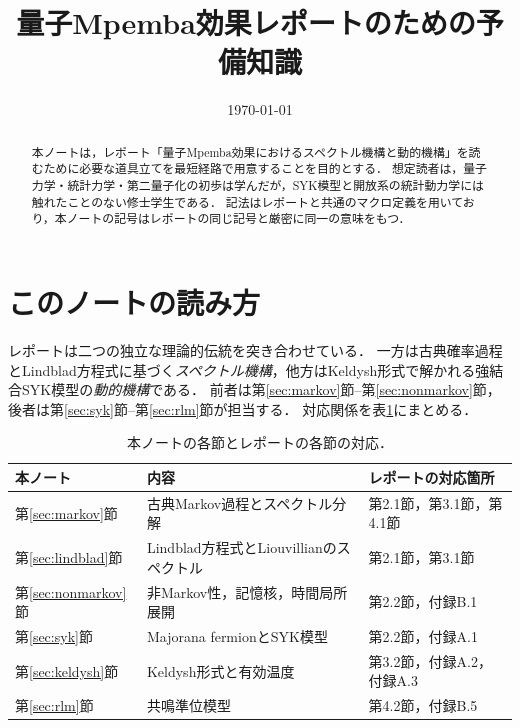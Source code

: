 \documentclass[a4paper,11pt,onecolumn]{jlreq}
\title{量子Mpemba効果レポートのための予備知識}
\author{}
\date{\today}
\begin{document}
\maketitle

\begin{abstract}
本ノートは，レポート「量子Mpemba効果におけるスペクトル機構と動的機構」を読むために必要な道具立てを最短経路で用意することを目的とする．
想定読者は，量子力学・統計力学・第二量子化の初歩は学んだが，SYK模型と開放系の統計動力学には触れたことのない修士学生である．
記法はレポートと共通のマクロ定義を用いており，本ノートの記号はレポートの同じ記号と厳密に同一の意味をもつ．
\end{abstract}

\section{このノートの読み方}
\label{sec:howto}

レポートは二つの独立な理論的伝統を突き合わせている．
一方は古典確率過程とLindblad方程式に基づく\emph{スペクトル機構}，他方はKeldysh形式で解かれる強結合SYK模型の\emph{動的機構}である．
前者は第\ref{sec:markov}節--第\ref{sec:nonmarkov}節，後者は第\ref{sec:syk}節--第\ref{sec:rlm}節が担当する．
対応関係を表\ref{tab:map}にまとめる．

\begin{table}[htbp]
  \centering
  \caption{本ノートの各節とレポートの各節の対応．}
  \label{tab:map}
  \small
  \begin{tabular}{@{}lll@{}}
    \toprule
    本ノート & 内容 & レポートの対応箇所 \\
    \midrule
    第\ref{sec:markov}節 & 古典Markov過程とスペクトル分解 & 第2.1節，第3.1節，第4.1節 \\
    第\ref{sec:lindblad}節 & Lindblad方程式とLiouvillianのスペクトル & 第2.1節，第3.1節 \\
    第\ref{sec:nonmarkov}節 & 非Markov性，記憶核，時間局所展開 & 第2.2節，付録B.1 \\
    第\ref{sec:syk}節 & Majorana fermionとSYK模型 & 第2.2節，付録A.1 \\
    第\ref{sec:keldysh}節 & Keldysh形式と有効温度 & 第3.2節，付録A.2，付録A.3 \\
    第\ref{sec:rlm}節 & 共鳴準位模型 & 第4.2節，付録B.5 \\
    \bottomrule
  \end{tabular}
\end{table}
\end{document}
